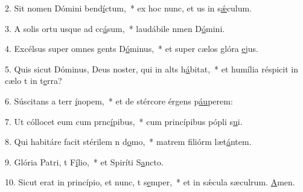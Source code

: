 2. Sit nomen Dómini bend\uline{í}ctum,~* ex hoc nunc, et us in s\uline{ǽ}culum.\par 
3. A solis ortu usque ad cc\uline{á}sum,~* laudábile nmen D\uline{ó}mini.\par 
4. Excélsus super omnes gents D\uline{ó}minus,~* et super cælos glóra \uline{e}jus.\par 
5. Quis sicut Dóminus, Deus noster, qui in alts h\uline{á}bitat,~* et humília réspicit in cælo t in t\uline{e}rra?\par 
6. Súscitans a terr \uline{í}nopem,~* et de stércore érgens p\uline{áu}perem:\par 
7. Ut cóllocet eum cum prnc\uline{í}pibus,~* cum princípibus pópli s\uline{u}i.\par 
8. Qui habitáre facit stérilem n d\uline{o}mo,~* matrem filiórm læt\uline{á}ntem.\par 
9. Glória Patri, t F\uline{í}lio,~* et Spiríti S\uline{a}ncto.\par 
10. Sicut erat in princípio, et nunc, t s\uline{e}mper,~* et in sǽcula sæculrum. \uline{A}men.\par 
